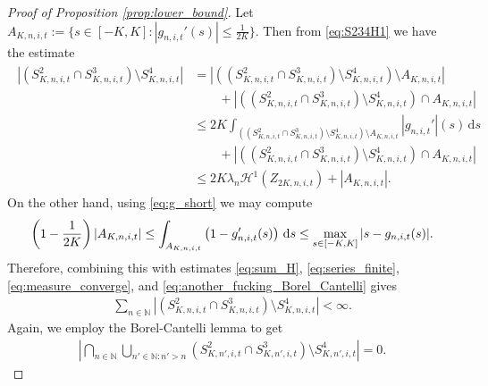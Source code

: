 \documentclass[11pt]{article}
\numberwithin{statement}{section}
\numberwithin{equation}{section}
\theoremstyle{remark}
\newcommand{\N}{\mathbb N}
\newcommand{\intd}{\, \mathrm{d}} 				%
\begin{document}
\begin{proof}[Proof of Proposition \ref{prop:lower_bound}]
        Let
        $A_{K,n,i,t}:= \{ s \in [-K,K] : |g_{n,i,t}'(s)| \leq
        \frac{1}{2K} \}$. Then from \eqref{eq:S234H1} we have the
      estimate
        \begin{align}\label{eq:sum_H}
          \begin{split}
            \left| \left(S^2_{K,n,i,t} \cap S^3_{K,n,i,t} \right)
              \setminus S^4_{K,n,i,t} \right| & = \left| \left(
                \left(S^2_{K,n,i,t} \cap S^3_{K,n,i,t} \right)
                \setminus S^4_{K,n,i,t} \right) \setminus A_{K,n,i,t}\right| \\
            & \qquad + \left| \left( \left(S^2_{K,n,i,t} \cap
                  S^3_{K,n,i,t} \right)
                \setminus S^4_{K,n,i,t} \right) \cap A_{K,n,i,t} \right|  \\
            & \leq 2K \int_{\left( \left(S^2_{K,n,i,t} \cap
                  S^3_{K,n,i,t} \right) \setminus S^4_{K,n,i,t}
              \right) \setminus A_{K,n,i,t} } \left |g_{n,i,t}'
            \right|(s) \intd s \\
            & \qquad + \left| \left( \left(S^2_{K,n,i,t} \cap
                  S^3_{K,n,i,t} \right)
                \setminus S^4_{K,n,i,t} \right) \cap A_{K,n,i,t} \right| \\
            & \leq 2 K \lambda_n \mathcal{H}^1(Z_{2K,n,i,t}) +
            |A_{K,n,i,t}|.
         \end{split}
        \end{align}        
        On the other hand, using \eqref{eq:g_short} we may
        compute
        \begin{align}
          \left( 1- {1 \over 2 K} \right) |A_{K,n,i,t}| \leq
          \int_{A_{K,n,i,t}} \left( 1- 
          g_{n,i,t}'(s) \right) \intd s \leq \max_{s \in [-K,K]}
          | s - g_{n,i,t}(s)| . 
        \end{align}
        Therefore, combining this with estimates
          \eqref{eq:sum_H}, \eqref{eq:series_finite},
        \eqref{eq:measure_converge}, and
        \eqref{eq:another_fucking_Borel_Cantelli} gives
        \begin{align}\label{eq:some_series_finite}
          \sum_{n\in \N} \left| \left(S^2_{K,n,i,t} \cap
          S^3_{K,n,i,t} \right) \setminus S^4_{K,n,i,t}\right| <
          \infty. 
        \end{align}
       Again, we employ the Borel-Cantelli lemma to get
       \begin{align}
         \label{eq:BCS234}
          \left| \bigcap_{n\in \N }\bigcup_{n'\in \N: n' >n }
          \left(S^2_{K,n',i,t} \cap  S^3_{K,n',i,t} \right) \setminus
          S^4_{K,n',i,t}  \right| =0.  
	\end{align}
        

\end{proof}
\end{document}
